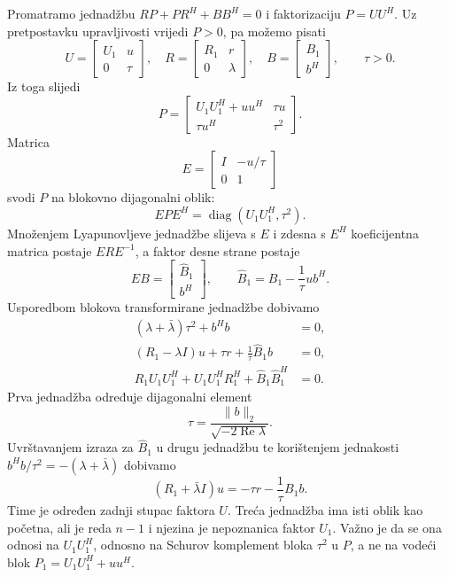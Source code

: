 \documentclass[12pt,a4paper]{article}
\begin{document}
Promatramo jednadžbu $RP + PR^{H} + BB^{H} = 0$ i faktorizaciju $P = UU^{H}$. Uz pretpostavku upravljivosti vrijedi $P > 0$, pa možemo pisati
\[
U = \begin{bmatrix} U_1 & u \\ 0 & \tau \end{bmatrix}, \quad
R = \begin{bmatrix} R_1 & r \\ 0 & \lambda \end{bmatrix}, \quad
B = \begin{bmatrix} B_1 \\ b^{H} \end{bmatrix}, \qquad \tau > 0.
\]
Iz toga slijedi
\[
P = \begin{bmatrix}
U_1U_1^{H} + uu^{H} & \tau u \\
\tau u^{H} & \tau^2
\end{bmatrix}.
\]
Matrica
\[
E = \begin{bmatrix} I & -u/\tau \\ 0 & 1 \end{bmatrix}
\]
svodi $P$ na blokovno dijagonalni oblik:
\[
EPE^{H} = \operatorname{diag}(U_1U_1^{H},\tau^2).
\]
Množenjem Lyapunovljeve jednadžbe slijeva s $E$ i zdesna s $E^{H}$ koeficijentna matrica postaje $ERE^{-1}$, a faktor desne strane postaje
\[
EB = \begin{bmatrix} \widehat{B}_1 \\ b^{H} \end{bmatrix}, \qquad
\widehat{B}_1 = B_1 - \frac{1}{\tau}ub^{H}.
\]
Usporedbom blokova transformirane jednadžbe dobivamo
\begin{align*}
(\lambda + \bar{\lambda})\tau^2 + b^{H}b &= 0, \\
(R_1 - \lambda I)u + \tau r + \frac{1}{\tau}\widehat{B}_1b &= 0, \\
R_1U_1U_1^{H} + U_1U_1^{H}R_1^{H} + \widehat{B}_1\widehat{B}_1^{H} &= 0.
\end{align*}
Prva jednadžba određuje dijagonalni element
\[
\tau = \frac{\lVert b\rVert_2}{\sqrt{-2\operatorname{Re}\lambda}}.
\]
Uvrštavanjem izraza za $\widehat{B}_1$ u drugu jednadžbu te korištenjem jednakosti $b^{H}b/\tau^2 = -(\lambda + \bar{\lambda})$ dobivamo
\[
(R_1 + \bar{\lambda}I)u = -\tau r - \frac{1}{\tau}B_1b.
\]
Time je određen zadnji stupac faktora $U$. Treća jednadžba ima isti oblik kao početna, ali je reda $n-1$ i njezina je nepoznanica faktor $U_1$. Važno je da se ona odnosi na $U_1U_1^{H}$, odnosno na Schurov komplement bloka $\tau^2$ u $P$, a ne na vodeći blok $P_1 = U_1U_1^{H} + uu^{H}$.
\end{document}
